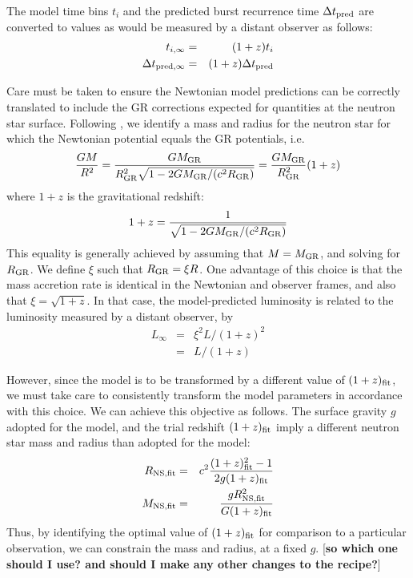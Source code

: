 \documentclass{aastex63}
\begin{document}
The model time bins  $t_i$ and the predicted burst recurrence time $\Delta t_{\rm pred}$ are converted to values as would be measured by a distant observer as follows:
\begin{eqnarray}
t_{i,\infty} & = & (1+z)t_i \\
\Delta t_{{\rm pred},\infty} & = & (1+z)\Delta t_{\rm pred}
\end{eqnarray}

Care must be taken to ensure the Newtonian model predictions can be correctly translated to include the GR corrections expected for quantities at the neutron star surface.
%
Following \cite{lampe16}, 
we identify a mass and radius for the neutron star for which the Newtonian potential equals the GR potentials, i.e.
\begin{equation}
\frac{GM}{R^2} = \frac{GM_{\rm GR}}{R^2_{\rm GR}\sqrt{1-2GM_{\rm GR}/(c^2R_{\rm GR})}} = \frac{GM_{\rm GR}}{R^2_{\rm GR}}(1+z)
\end{equation}
where $1+z$ is the gravitational redshift:
\begin{equation}
1+z = \frac{1}{\sqrt{1-2GM_{\rm GR}/(c^2R_{\rm GR})}}
\end{equation}
This equality is generally achieved by assuming that $M=M_{\rm GR}$, and solving for $R_{\rm GR}$. 
We define $\xi$ such that $R_{\rm GR}=\xi R$. 
One advantage of this choice is that the mass accretion rate is identical in the Newtonian and observer frames, and also that $\xi = \sqrt{1 + z}$. In that case, the model-predicted luminosity is related to the luminosity measured by a distant observer, by 
\begin{eqnarray}
L_\infty & = & \xi^2L/(1+z)^2 \nonumber \\
& = & L/(1+z)
\end{eqnarray}

However, since the model is to be transformed by a different value of $(1+z)_{\rm fit}$, we must take care to consistently transform the model parameters in accordance with this choice.
%
We can achieve this objective as follows. The surface gravity $g$ adopted for the model, and the trial redshift $(1+z)_{\rm fit}$ imply a different neutron star mass and radius than adopted for the model: 
%
\begin{eqnarray}
R_{\rm NS,fit} &=& c^2\frac{(1+z)_{\rm fit}^2-1}{2g(1+z)_{\rm fit}}\\
M_{\rm NS,fit} &=& \frac{gR_{\rm NS,fit}^2}{G(1+z)_{\rm fit}}
\end{eqnarray}
Thus, by identifying the optimal value of $(1+z)_{\rm fit}$ for comparison to a particular observation, we can constrain the mass and radius, at a fixed $g$. [{\bf so which one should I use? and should I make any other changes to the recipe?}]
\end{document}
